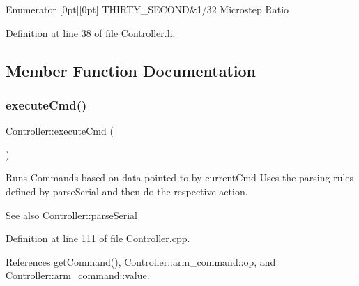 \begin{DoxyEnumFields}{Enumerator}
[0pt][0pt]{}\mbox{\label{class_controller_aa94f1aea40982c422a43c1ee5aea0c49aad17f41f310f462eb36ac9f6bac29b57}} 
T\+H\+I\+R\+T\+Y\+\_\+\+S\+E\+C\+O\+ND&1/32 Microstep Ratio \\
\hline

\end{DoxyEnumFields}


Definition at line 38 of file Controller.\+h.



\subsection{Member Function Documentation}
\mbox{\label{class_controller_ac1fc6cd2f507cc05e66a602e809c2446}} 
\subsubsection{\texorpdfstring{execute\+Cmd()}{executeCmd()}}
{\footnotesize\ttfamily Controller\+::execute\+Cmd (\begin{DoxyParamCaption}{ }\end{DoxyParamCaption})}



Runs Commands based on data pointed to by current\+Cmd Uses the parsing rules defined by parse\+Serial and then do the respective action. 

\begin{DoxySeeAlso}{See also}
\hyperlink{class_controller_ad7583687bca402756ed9a4a8dc2e29ee}{Controller\+::parse\+Serial} 
\end{DoxySeeAlso}


Definition at line 111 of file Controller.\+cpp.



References get\+Command(), Controller\+::arm\+\_\+command\+::op, and Controller\+::arm\+\_\+command\+::value.

